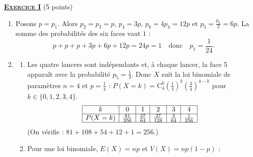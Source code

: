 \providecommand{\Plan}{(\mathscr{P})}
\providecommand{\Ouv}{(O ; \vec{u} , \vec{v})}
\providecommand{\Courbe}{(\mathscr{C})}
\providecommand{\D}{(\mathscr{D})}
\providecommand{\cm}{~\mathrm{cm}}
\providecommand{\dx}{~\mathrm{d}x}
\providecommand{\Arg}[1]{\mathrm{Arg}\left( #1 \right)}
%
\noindent \underline{\textsc{\textbf{Exercice I}}} (5 points)
\begin{enumerate}
   \item {}
      Posons $p = p_1$. Alors $p_2 = p_3 = p$, $p_4 = 3p$, $p_6 = 4p_4 = 12p$ et $p_5 = \frac{p_6}{2} = 6p$.
      La somme des probabilit\'es des six faces vaut $1$ :
      \[
         p + p + p + 3p + 6p + 12p = 24p = 1 \quad\text{donc}\quad p_1 = \frac{1}{24}.
      \]
      \par\noindent{}
   \item
      \begin{enumerate}
         \item {}
            Les quatre lancers sont ind\'ependants et, \`a chaque lancer, la face 5 appara\^it avec la probabilit\'e
            $p_5 = \frac{1}{4}$. Donc $X$ suit la loi binomiale de param\`etres $n = 4$ et $p = \frac{1}{4}$ :
            $P(X = k) = \mathrm{C}_4^k \left(\frac{1}{4}\right)^k \left(\frac{3}{4}\right)^{4-k}$ pour $k \in \{0,1,2,3,4\}$.
            \[
               \begin{array}{|c|c|c|c|c|c|}
                  \hline
                  k & 0 & 1 & 2 & 3 & 4 \\ \hline
                  P(X = k) & \frac{81}{256} & \frac{27}{64} & \frac{27}{128} & \frac{3}{64} & \frac{1}{256} \\ \hline
               \end{array}
            \]
            (On v\'erifie : $81 + 108 + 54 + 12 + 1 = 256$.)
         \item {}
            Pour une loi binomiale, $E(X) = np$ et $V(X) = np(1-p)$ :
            \par\noindent{}
      \end{enumerate}

\end{enumerate}
